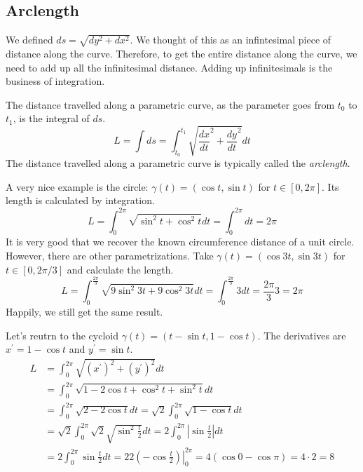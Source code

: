 \documentclass[fleqn]{report}
\begin{document}
\subsection{Arclength}
\label{arclength}

We defined $ds = \sqrt{dy^2 + dx^2}$. We thought of this as
an infintesimal piece of distance along the curve. Therefore,
to get the entire distance along the curve, we need to add up
all the infinitesimal distance. Adding up infinitesimals is
the business of integration. 

\begin{defn}
The distance travelled along a parametric curve, as the
parameter goes from $t_0$ to $t_1$, is the integral of $ds$.
\begin{equation*}
L = \int ds = \int_{t_0}^{t_1} \sqrt{\frac{dx}{dt}^2
+\frac{dy}{dt}^2}dt 
\end{equation*}
The distance travelled along a parametric curve is typically
called the \emph{arclength}.
\end{defn}

\begin{example}
A very nice example is the circle: $\gamma(t) = (\cos t, \sin
t)$ for $t \in [0,2\pi]$. Its length is calculated by 
integration.
\begin{equation*}
L = \int_0^{2\pi} \sqrt{ \sin^2 t+ \cos^2 t}dt = \int_0^{2\pi}
dt = 2\pi
\end{equation*}
It is very good that we recover the known circumference
distance of a unit circle. However, there are other
parametrizations. 
Take $\gamma(t) = (\cos 3t, \sin 3t)$ for $t \in [0,
2\pi/3]$ and calculate the length. 
\begin{equation*}
L = \int_0^{\frac{2\pi}{3}} \sqrt{ 9\sin^2 3t+ 9\cos^2 3t}dt =
\int_0^{\frac{2\pi}{3}} 3 dt = \frac{2\pi}{3} 3 = 2\pi
\end{equation*}
Happily, we still get the same result.
\end{example}

\begin{example}
Let's reutrn to the cycloid $\gamma(t) =
(t-\sin t, 1-\cos t)$. The derivatives are $x^\prime = 1-\cos
t$ and $y^\prime = \sin t$. 
\begin{align*}
L & = \int_0^{2\pi} \sqrt{(x^\prime)^2 + (y^\prime)^2 } dt \\
& = \int_0^{2\pi} \sqrt{1 - 2\cos t + \cos^2 t + \sin^2 t} dt \\
& = \int_0^{2\pi} \sqrt{2 - 2\cos t} dt = \sqrt{2} \int_0^{2\pi}
\sqrt{1 - \cos t} dt \\
& = \sqrt{2} \int_0^{2\pi} \sqrt{2} \sqrt{\sin^2 \frac{t}{2}} dt 
= 2 \int_0^{2\pi} \left| \sin \frac{t}{2} \right| dt \\
& = 2 \int_0^{2\pi} \sin \frac{t}{2} dt 
= 2 2 \left. \left( - \cos \frac{t}{2} \right) \right|_0^{2\pi}
= 4( \cos 0 - \cos \pi) = 4 \cdot 2 = 8
\end{align*}
\end{example}
\end{document}
